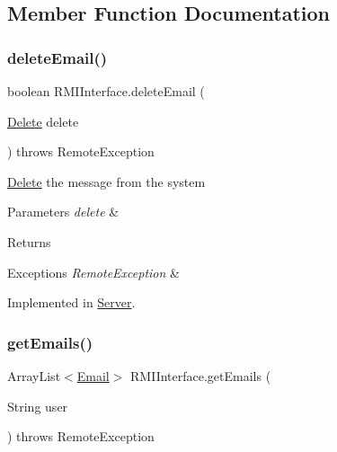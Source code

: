 \subsection{Member Function Documentation}
\mbox{\label{interface_r_m_i_interface_a86bc2a5cb0bdb04a1aeb9b36e373cd5e}} 
\subsubsection{\texorpdfstring{delete\+Email()}{deleteEmail()}}
{\footnotesize\ttfamily boolean R\+M\+I\+Interface.\+delete\+Email (\begin{DoxyParamCaption}\item[{\hyperlink{class_delete}{Delete}}]{delete }\end{DoxyParamCaption}) throws Remote\+Exception}

\hyperlink{class_delete}{Delete} the message from the system 
\begin{DoxyParams}{Parameters}
{\em delete} & \\
\hline
\end{DoxyParams}
\begin{DoxyReturn}{Returns}

\end{DoxyReturn}

\begin{DoxyExceptions}{Exceptions}
{\em Remote\+Exception} & \\
\hline
\end{DoxyExceptions}


Implemented in \hyperlink{class_server_ad679fc8c7704690482684e42cc15c740}{Server}.

\mbox{\label{interface_r_m_i_interface_ad326010c8c132dd3398a4443cf827601}} 
\subsubsection{\texorpdfstring{get\+Emails()}{getEmails()}}
{\footnotesize\ttfamily Array\+List$<$\hyperlink{class_email}{Email}$>$ R\+M\+I\+Interface.\+get\+Emails (\begin{DoxyParamCaption}\item[{String}]{user }\end{DoxyParamCaption}) throws Remote\+Exception}

